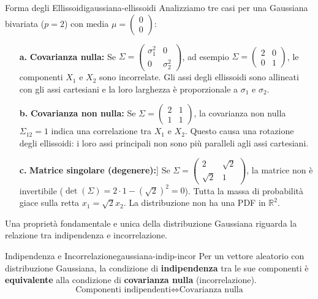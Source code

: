 \begin{esempio}{Forma degli Ellissoidi}{gaussiana-ellissoidi}
Analizziamo tre casi per una Gaussiana bivariata ($p=2$) con media $\mu =
\begin{pmatrix} 0 \\ 0 \end{pmatrix}$:
\begin{enumerate}
    \item[\textbf{a.}] \textbf{Covarianza nulla:} Se $\Sigma = \begin{pmatrix}
    \sigma_1^2 & 0 \\ 0 & \sigma_2^2 \end{pmatrix}$, ad esempio $\Sigma =
    \begin{pmatrix} 2 & 0 \\ 0 & 1 \end{pmatrix}$, le componenti $X_1$ e $X_2$
    sono incorrelate. Gli assi degli ellissoidi sono allineati con gli assi
    cartesiani e la loro larghezza è proporzionale a $\sigma_1$ e $\sigma_2$.
    
    \item[\textbf{b.}] \textbf{Covarianza non nulla:} Se $\Sigma =
    \begin{pmatrix} 2 & 1 \\ 1 & 1 \end{pmatrix}$, la covarianza non nulla
    $\Sigma_{12}=1$ indica una correlazione tra $X_1$ e $X_2$. Questo causa una
    rotazione degli ellissoidi: i loro assi principali non sono più paralleli
    agli assi cartesiani.
    
    \item[\textbf{c.}] \textbf{Matrice singolare (degenere):}] Se $\Sigma =
    \begin{pmatrix} 2 & \sqrt{2} \\ \sqrt{2} & 1 \end{pmatrix}$, la matrice non
    è invertibile ($\det(\Sigma) = 2 \cdot 1 - (\sqrt{2})^2 = 0$). Tutta la
    massa di probabilità giace sulla retta $x_1 = \sqrt{2} x_2$. La
    distribuzione non ha una PDF in $\mathbb{R}^2$.
\end{enumerate}
\end{esempio}

Una proprietà fondamentale e unica della distribuzione Gaussiana riguarda la
relazione tra indipendenza e incorrelazione.

\begin{teorema}{Indipendenza e Incorrelazione}{gaussiana-indip-incor}
Per un vettore aleatorio con distribuzione Gaussiana, la condizione di
\textbf{indipendenza} tra le sue componenti è \textbf{equivalente} alla
condizione di \textbf{covarianza nulla} (incorrelazione).
$$
\text{Componenti indipendenti} \iff \text{Covarianza nulla}
$$
\end{teorema}


